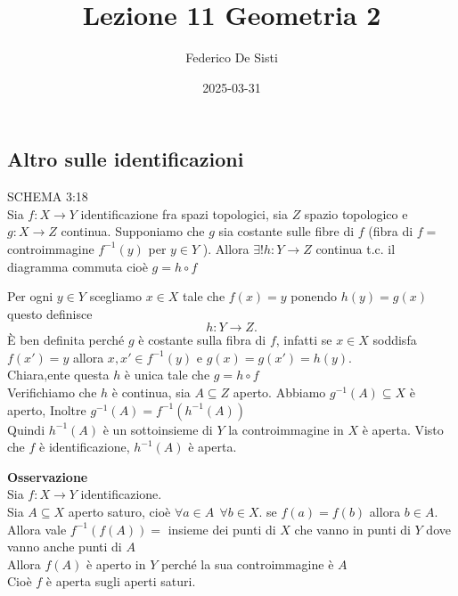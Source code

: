 \documentclass[12px]{article}
\title{Lezione 11 Geometria 2}
\date{2025-03-31}
\author{Federico De Sisti}
\begin{document}
	\maketitle
	\newpage
	\subsection{Altro sulle identificazioni}
	\begin{lemm}
		SCHEMA 3:18\\
		Sia $f:X \rightarrow Y$ identificazione fra spazi topologici, sia $Z$ spazio topologico e $g:X \rightarrow Z$ continua. Supponiamo che $g$ sia costante sulle fibre di $f$ (fibra di  $f = $ controimmagine  $f^{-1}(y)$ per $y\in Y$ ). Allora $\exists ! h: Y \rightarrow Z$ continua t.c. il diagramma commuta cioè $g = h\circ f$
	\end{lemm}
	\begin{dimo}
		Per ogni $y\in Y$ scegliamo $x\in X$ tale che  $f(x) = y$ ponendo  $h(y) = g(x)$ questo definisce
		 \[
		h:Y \rightarrow Z
		.\] 
		È ben definita perché $g$ è costante sulla fibra di $f$, infatti se $x\in X $ soddisfa $f(x') = y$ allora  $x,x'\in f^{-1}(y)$ e  $g(x) = g(x') = h(y)$.\\
		Chiara,ente questa  $h$ è unica tale che $g = h\circ f$\\
		Verifichiamo che  $h$ è continua, sia $A\subseteq Z$ aperto. Abbiamo  $g^{-1}(A)\subseteq X$ è aperto, Inoltre $g^{-1}(A) = f^{-1}(h^{-1}(A))$\\
		Quindi  $h^{-1}(A)$ è un sottoinsieme di $Y$ la controimmagine in $X$ è aperta. Visto che $f$ è identificazione, $h^{-1}(A)$ è aperta.
	\end{dimo}
	\textbf{Osservazione}\\
	Sia $f:X \rightarrow Y$ identificazione.\\
	Sia $A\subseteq X$ aperto saturo, cioè  $\forall a\in A \ \ \forall b\in X. $ se  $f(a) = f(b)$ allora  $b\in A$.\\
	Allora vale  $f^{-1}(f(A))=$ insieme dei punti di  $X$ che vanno in punti di $Y$ dove vanno anche punti di $A$\\
	Allora  $f(A)$ è aperto in $Y$ perché la sua controimmagine è $A$\\
	Cioè  $f$ è aperta sugli aperti saturi.
\end{document}
